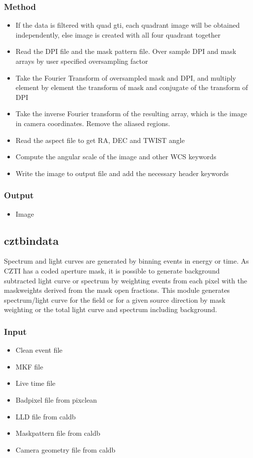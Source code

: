 \documentclass[11pt,oneside,a4paper]{article}
\begin{document}
\subsubsection*{Method}
\begin{itemize}
\item{If the data is filtered with quad gti, each quadrant image will be obtained 
independently, else image is created with all four quadrant together}
\item{Read the DPI file and the mask pattern file. Over sample DPI and mask arrays 
by user specified oversampling factor}
\item{Take the Fourier Transform of oversampled mask and DPI,  and multiply element by
element the transform of mask and conjugate of the transform of DPI}
\item{Take the inverse Fourier transform of the resulting array, which is 
the image in camera coordinates.  Remove the aliased regions.}
\item{Read the aspect file to get RA, DEC and TWIST angle}
\item{Compute the angular scale of the image and other WCS keywords}
\item{Write the image to output file and add the necessary header keywords}
\end{itemize}
\subsubsection*{Output}
\begin{itemize}
    \item{Image}
\end{itemize}


\subsection{cztbindata}
Spectrum and light curves are generated by binning events in energy or 
time. As CZTI has a coded aperture mask, it is possible to 
generate background subtracted light curve or spectrum by weighting events from 
each pixel with the maskweights derived from the mask open fractions. This 
module generates spectrum/light curve for the field or for a given source 
direction by mask weighting or the total light curve and spectrum including background.

\subsubsection*{Input}
\renewcommand\labelitemi{{\boldmath$\cdot$}}
\begin{itemize}
\item{Clean event file}
\item{MKF file}
\item{Live time file}
\item{Badpixel file from pixclean}
\item{LLD file from caldb}
\item{Maskpattern file from caldb}
\item{Camera geometry file from caldb}
\end{itemize}
\end{document}
